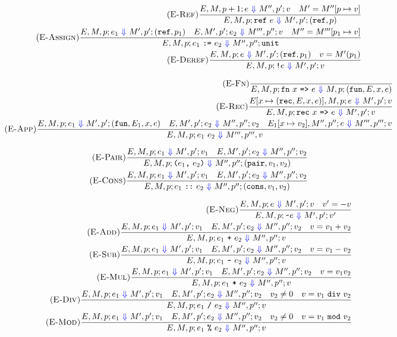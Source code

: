 \documentclass{article}
\newcommand{\To}{\ \textcolor{blue}{\Downarrow}\ }
\begin{document}
\begin{align*}
\tag{\sc E-Ref}
\frac{E,M,p+1;e\To M'',p';v \quad M'=M''[p\mapsto v]}
{E,M,p;\texttt{ref}\ e\To M',p';(\texttt{ref},p)}
\\
\tag{\sc E-Assign}
\frac{E,M,p;e_1\To M',p';(\texttt{ref},p_1) \quad E,M',p';e_2\To M''',p'';v \quad M''=M'''[p_1\mapsto v]}
{E,M,p;e_1\ \texttt{:=}\ e_2\To M'',p'';\texttt{unit}}
\\
\tag{\sc E-Deref}
\frac{E,M,p;e\To M',p';(\texttt{ref},p_1) \quad v=M'(p_1)}
{E,M,p;\texttt{!}e\To M',p';v}
\end{align*}

\begin{align*}
\tag{\sc E-Fn}
\frac{}
{E,M,p;\texttt{fn}\ x\ \texttt{=>}\ e\To M,p;(\texttt{fun},E,x,e)}
\\
\tag{\sc E-Rec}
\frac{E[x\mapsto(\texttt{rec},E,x,e)],M,p;e\To M',p';v}
{E,M,p;\texttt{rec}\ x\ \texttt{=>}\ e\To M',p';v}
\\
\tag{\sc E-App}
\frac{E,M,p;e_1\To M',p';(\texttt{fun},E_1,x,e) \quad E,M',p';e_2\To M'',p'';v_2 \quad E_1[x\mapsto v_2],M'',p'';e\To M''',p''';v}
{E,M,p;e_1\ e_2\To M''',p''',v}
\end{align*}

\begin{align*}
\tag{\sc E-Pair}
\frac{E,M,p;e_1\To M',p';v_1 \quad E,M',p';e_2\To M'',p'';v_2}
{E,M,p;\texttt{(}e_1\texttt{,}\ e_2\texttt{)}\To M'',p'';(\texttt{pair},v_1,v_2)}
\\
\tag{\sc E-Cons}
\frac{E,M,p;e_1\To M',p';v_1 \quad E,M',p';e_2\To M'',p'';v_2}
{E,M,p;e_1\ \texttt{::}\ e_2\To M'',p'';(\texttt{cons},v_1,v_2)}
\end{align*}

\begin{align*}
\tag{\sc E-Neg}
\frac{E,M,p;e\To M',p';v \quad v'=-v}
{E,M,p;\texttt{\textasciitilde}e\To M',p';v'}
\\
\tag{\sc E-Add}
\frac{E,M,p;e_1\To M',p';v_1 \quad E,M',p';e_2\To M'',p'';v_2 \quad v=v_1+v_2}
{E,M,p;e_1\ \texttt{+}\ e_2\To M'',p'';v}
\\
\tag{\sc E-Sub}
\frac{E,M,p;e_1\To M',p';v_1 \quad E,M',p';e_2\To M'',p'';v_2 \quad v=v_1-v_2}
{E,M,p;e_1\ \texttt{-}\ e_2\To M'',p'';v}
\\
\tag{\sc E-Mul}
\frac{E,M,p;e_1\To M',p';v_1 \quad E,M',p';e_2\To M'',p'';v_2 \quad v=v_1 v_2}
{E,M,p;e_1\ \texttt{*}\ e_2\To M'',p'';v}
\\
\tag{\sc E-Div}
\frac{E,M,p;e_1\To M',p';v_1 \quad E,M',p';e_2\To M'',p'';v_2 \quad v_2\ne 0 \quad v=v_1\ \mathtt{div}\ v_2}
{E,M,p;e_1\ \texttt{/}\ e_2\To M'',p'';v}
\\
\tag{\sc E-Mod}
\frac{E,M,p;e_1\To M',p';v_1 \quad E,M',p';e_2\To M'',p'';v_2 \quad v_2\ne 0 \quad v=v_1\ \mathtt{mod}\ v_2}
{E,M,p;e_1\ \texttt{\%}\ e_2\To M'',p'';v}
\end{align*}
\end{document}
